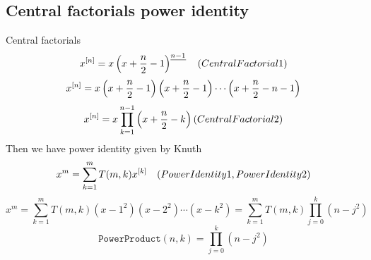 \subsection{Central factorials power identity}\label{subsec:central-factorials-power-identity}
Central factorials
\begin{equation*}
    x^{[n]} = x \left(x+\frac{n}{2}-1 \right)^{\underline{n-1}} \quad
    (CentralFactorial1)
\end{equation*}
\begin{equation*}
    x^{[n]} = x \left( x+\frac{n}{2}-1 \right) \left( x+\frac{n}{2}-1 \right) \cdots \left (x+\frac{n}{2}-n-1 \right)
\end{equation*}
\begin{equation*}
    x^{[n]} = x \prod_{k=1}^{n-1} \left( x+\frac{n}{2}-k \right)
    (CentralFactorial2)
\end{equation*}
Then we have power identity given by Knuth
\begin{equation*}
    x^m = \sum_{k=1}^{m} T(m, k) x^{[k]} \quad
    (PowerIdentity1, PowerIdentity2)
\end{equation*}
\begin{equation*}
    x^m = \sum_{k=1}^{m} T(m, k) (x-1^2)(x-2^2)\cdots(x-k^2) = \sum_{k=1}^{m} T(m, k) \prod_{j=0}^{k} (n-j^2)
\end{equation*}
\begin{equation*}
    \mathtt{PowerProduct}(n, k) = \prod_{j=0}^{k} (n-j^2)
\end{equation*}